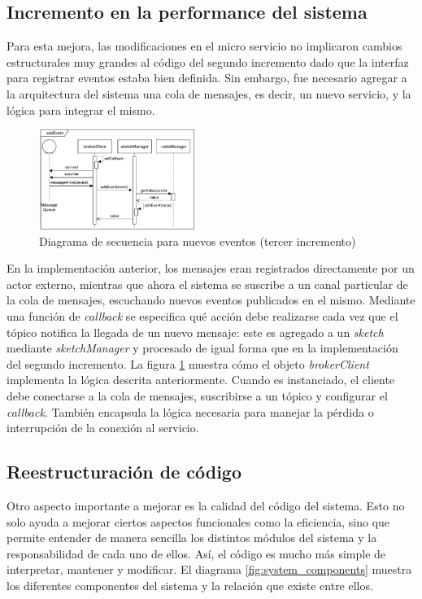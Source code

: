 \documentclass[a4paper,10pt, oneside]{article}
\begin{document}
\subsection{Incremento en la performance del sistema}
Para esta mejora, las modificaciones en el micro servicio no implicaron cambios estructurales muy grandes al código del segundo incremento dado que la interfaz para registrar eventos estaba bien definida. Sin embargo, fue necesario agregar a la arquitectura del sistema una cola de mensajes, es decir, un nuevo servicio, y la lógica para integrar el mismo. 

\begin{figure}[htbp]
	\centering
	\includegraphics[width=0.45\textwidth]{./graph/SecDiag-resourceAddEventMosquitto.pdf}
	\caption{Diagrama de secuencia para nuevos eventos (tercer incremento)}
	\label{fig:SecDiagResourceAddEvent-Mosquitto}
\end{figure}

En la implementación anterior, los mensajes eran registrados directamente por un actor externo, mientras que ahora el sistema se suscribe a un canal particular de la cola de mensajes, escuchando nuevos eventos publicados en el mismo. Mediante una función de \textit{callback} se especifica qué acción debe realizarse cada vez que el tópico notifica la llegada de un nuevo mensaje: este es agregado a un \textit{sketch} mediante  \textit{sketchManager} y procesado de igual forma que en la implementación del segundo incremento.
La figura \ref{fig:SecDiagResourceAddEvent-Mosquitto} muestra cómo el objeto \textit{brokerClient} implementa la lógica descrita anteriormente. Cuando es instanciado, el cliente debe conectarse a la cola de mensajes,  suscribirse a un tópico y configurar el \textit{callback}. También encapsula la lógica necesaria para manejar la pérdida o interrupción de la conexión al servicio.

\subsection{Reestructuración de código}
Otro aspecto importante a mejorar es la calidad del código del sistema. Esto no solo ayuda a mejorar ciertos aspectos funcionales como la eficiencia, sino que permite entender de manera sencilla los distintos módulos del sistema y la responsabilidad de cada uno de ellos. Así, el código es mucho más simple de interpretar, mantener y modificar.
El diagrama \ref{fig:system_components} muestra los diferentes componentes del sistema y la relación que existe entre ellos.
\end{document}
